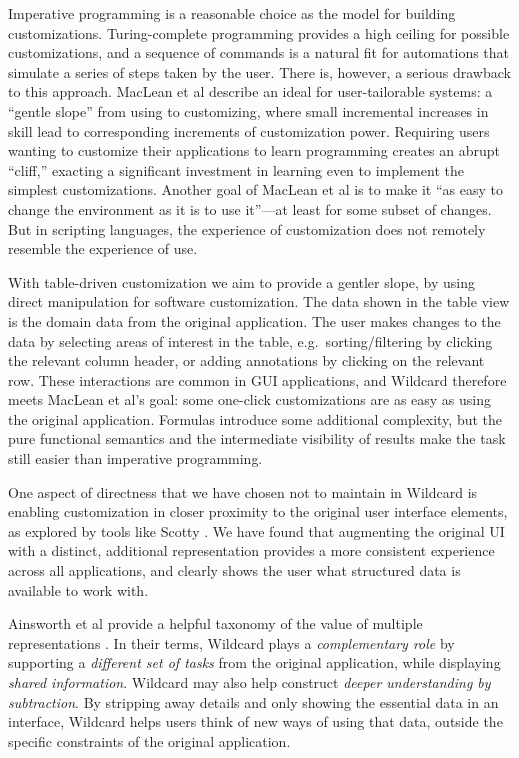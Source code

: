 \documentclass[sigplan,screen,10pt,anonymous,review]{acmart}
\begin{document}
Imperative programming is a reasonable choice as the model for building
customizations. Turing-complete programming provides a high ceiling for
possible customizations, and a sequence of commands is a natural fit for
automations that simulate a series of steps taken by the user. There is,
however, a serious drawback to this approach. MacLean et al
\citep{maclean1990} describe an ideal for user-tailorable systems: a
``gentle slope'' from using to customizing, where small incremental
increases in skill lead to corresponding increments of customization
power. Requiring users wanting to customize their applications to learn
programming creates an abrupt ``cliff,'' exacting a significant
investment in learning even to implement the simplest customizations.
Another goal of MacLean et al is to make it ``as easy to change the
environment as it is to use it''---at least for some subset of changes.
But in scripting languages, the experience of customization does not
remotely resemble the experience of use.

With table-driven customization we aim to provide a gentler slope, by
using direct manipulation for software customization. The data shown in
the table view is the domain data from the original application. The
user makes changes to the data by selecting areas of interest in the
table, e.g.~sorting/filtering by clicking the relevant column header, or
adding annotations by clicking on the relevant row. These interactions
are common in GUI applications, and Wildcard therefore meets MacLean et
al's goal: some one-click customizations are as easy as using the
original application. Formulas introduce some additional complexity, but
the pure functional semantics and the intermediate visibility of results
make the task still easier than imperative programming.

One aspect of directness that we have chosen not to maintain in Wildcard
is enabling customization in closer proximity to the original user
interface elements, as explored by tools like Scotty \citep{eagan2011}.
We have found that augmenting the original UI with a distinct,
additional representation provides a more consistent experience across
all applications, and clearly shows the user what structured data is
available to work with.

Ainsworth et al provide a helpful taxonomy of the value of multiple
representations \citep{ainsworth1999}. In their terms, Wildcard plays a
\emph{complementary role} by supporting a \emph{different set of tasks}
from the original application, while displaying \emph{shared
information}. Wildcard may also help construct \emph{deeper
understanding by subtraction}. By stripping away details and only
showing the essential data in an interface, Wildcard helps users think
of new ways of using that data, outside the specific constraints of the
original application.
\end{document}
